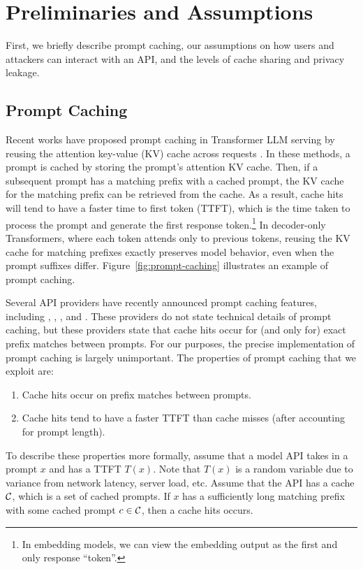 \section{Preliminaries and Assumptions}

First, we briefly describe prompt caching, our assumptions on how users and attackers can interact with an API, and the levels of cache sharing and privacy leakage.

\subsection{Prompt Caching}

Recent works have proposed prompt caching in Transformer \citep{vaswani2017attention} LLM serving by reusing the attention key-value (KV) cache across requests \citep{zheng2024sglang,gim2024prompt}. In these methods, a prompt is cached by storing the prompt's attention KV cache. Then, if a subsequent prompt has a matching prefix with a cached prompt, the KV cache for the matching prefix can be retrieved from the cache. As a result, cache hits will tend to have a faster time to first token (TTFT), which is the time taken to process the prompt and generate the first response token.\footnote{In embedding models, we can view the embedding output as the first and only response ``token''.} In decoder-only Transformers, where each token attends only to previous tokens, reusing the KV cache for matching prefixes exactly preserves model behavior, even when the prompt suffixes differ. Figure~\ref{fig:prompt-caching} illustrates an example of prompt caching. 

Several API providers have recently announced prompt caching features, including \citet{anthropic-caching-news}, \citet{deepseek-caching}, \citet{fireworks-caching}, and \citet{openai-caching-news}. These providers do not state technical details of prompt caching, but these providers state that cache hits occur for (and only for) exact prefix matches between prompts. For our purposes, the precise implementation of prompt caching is largely unimportant. The properties of prompt caching that we exploit are:
\begin{enumerate}
    \item Cache hits occur on prefix matches between prompts.
    \item Cache hits tend to have a faster TTFT than cache misses (after accounting for prompt length).
\end{enumerate}
To describe these properties more formally, assume that a model API takes in a prompt $x$ and has a TTFT $T(x)$. Note that $T(x)$ is a random variable due to variance from network latency, server load, etc. Assume that the API has a cache $\mathcal{C}$, which is a set of cached prompts. If $x$ has a sufficiently long matching prefix with some cached prompt $c \in \mathcal{C}$, then a cache hits occurs.


